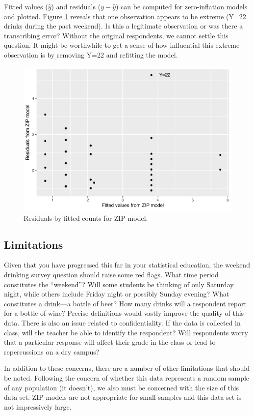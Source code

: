 \documentclass[
]{krantz}
\begin{document}
Fitted values (\(\hat{y}\)) and residuals (\(y-\hat{y}\)) can be computed for zero-inflation models and plotted. Figure \ref{fig:poisRes} reveals that one observation appears to be extreme (Y=22 drinks during the past weekend). Is this a legitimate observation or was there a transcribing error? Without the original respondents, we cannot settle this question. It might be worthwhile to get a sense of how influential this extreme observation is by removing Y=22 and refitting the model.

\begin{figure}

{\centering \includegraphics[width=0.6\linewidth]{bookdown-BeyondMLR_files/figure-latex/poisRes-1} 

}

\caption{Residuals by fitted counts for ZIP model.}\label{fig:poisRes}
\end{figure}

\subsection{Limitations}\label{limitations}

Given that you have progressed this far in your statistical education, the weekend drinking survey question should raise some red flags. What time period constitutes the ``weekend''? Will some students be thinking of only Saturday night, while others include Friday night or possibly Sunday evening? What constitutes a drink---a bottle of beer? How many drinks will a respondent report for a bottle of wine? Precise definitions would vastly improve the quality of this data. There is also an issue related to confidentiality. If the data is collected in class, will the teacher be able to identify the respondent? Will respondents worry that a particular response will affect their grade in the class or lead to repercussions on a dry campus?

In addition to these concerns, there are a number of other limitations that should be noted. Following the concern of whether this data represents a random sample of any population (it doesn't), we also must be concerned with the size of this data set. ZIP models are not appropriate for small samples and this data set is not impressively large.
\end{document}
